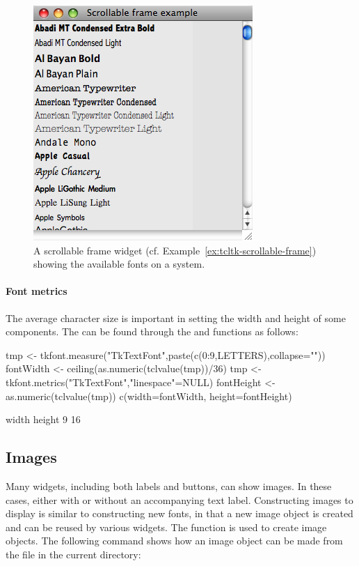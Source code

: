 \begin{figure}
  \centering
  \includegraphics[width=.6\textwidth]{fig-tcltk-all-fonts.png}
  \caption{A scrollable frame widget (cf. Example~\ref{ex:tcltk-scrollable-frame}) showing the available fonts on a system.}
  \label{fig:fig-tcltk-all-fonts}
\end{figure}


\paragraph{Font metrics}
The average character size is important in setting the width and
height of some components. The can be found through the
 and  functions as
follows:
\begin{Schunk}
\begin{Sinput}
 tmp <- tkfont.measure("TkTextFont",paste(c(0:9,LETTERS),collapse=""))
 fontWidth <- ceiling(as.numeric(tclvalue(tmp))/36)
 tmp <- tkfont.metrics("TkTextFont","linespace"=NULL)
 fontHeight <- as.numeric(tclvalue(tmp))
 c(width=fontWidth, height=fontHeight)
\end{Sinput}
\begin{Soutput}
 width height 
     9     16 
\end{Soutput}
\end{Schunk}


\subsection{Images}
\label{sec:tcltk:overview:images}


Many  widgets, including both labels and buttons, can show
images. In these cases, either with or without an accompanying text
label. Constructing images to display is similar to constructing new
fonts, in that a new image object is created and can be reused by
various widgets. The  function is used to
create image objects. The following command shows how an image object
can be made from the file  in the current directory:

